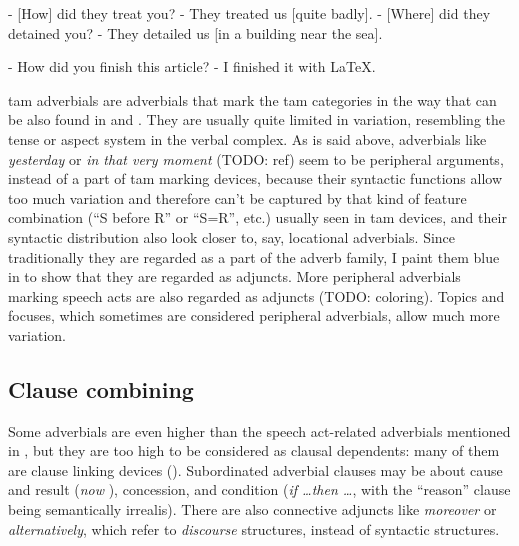 \documentclass[UTF8, a4paper, oneside, scheme=plain, 12pt]{ctexbook}
\newcommand{\form}[1]{\emph{#1}}
\begin{document}
\begin{exe}
    \ex\label{ex:simple-clause.dependents.ex-1} - [How] did they treat you? - They treated us [quite badly].
    \ex\label{ex:simple-clause.dependents.ex-2} - [Where] did they detained you? - They detailed us [in a building near the sea].
\end{exe}

\begin{exe}
    \ex\label{ex:simple-clause.dependents.ex-3} - How did you finish this article? 
    - I finished it with LaTeX.
\end{exe}


\acs{tam} adverbials are adverbials that mark the \acs{tam} categories 
in the way that can be also found in 
and .
They are usually quite limited in variation,
resembling the tense or aspect system in the verbal complex.
As is said above, adverbials like \form{yesterday} or \form{in that very moment} (TODO: ref)
seem to be peripheral arguments, instead of a part of \acs{tam} marking devices,
because their syntactic functions allow too much variation 
and therefore can't be captured by that kind of feature combination 
(``S before R'' or ``S=R'', etc.)
usually seen in \acs{tam} devices,
and their syntactic distribution also look closer to, say, locational adverbials.
Since traditionally they are regarded as a part of the adverb family, 
I paint them blue in  to show that they are regarded as adjuncts.
More peripheral adverbials marking speech acts are also regarded as adjuncts (TODO: coloring).
Topics and focuses, which sometimes are considered peripheral adverbials,
allow much more variation. 

\subsection{Clause combining}

Some adverbials are even higher than the speech act-related adverbials 
mentioned in ,
but they are too high to be considered as clausal dependents:
many of them are clause linking devices ().
Subordinated adverbial clauses may be about 
cause and result (\form{now }), 
concession, 
and condition (\form{if \dots then \dots}, with the ``reason'' clause being semantically irrealis).
There are also connective adjuncts like \form{moreover} or \form{alternatively},
which refer to \emph{discourse} structures, instead of syntactic structures.
\end{document}
